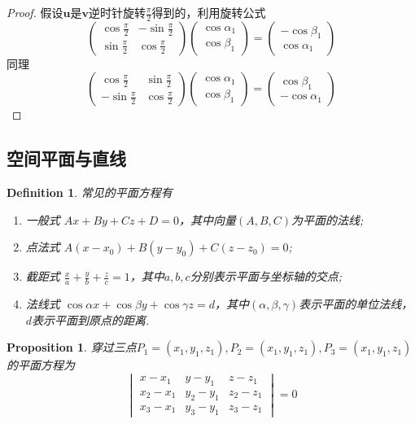 \documentclass{article}
\newcommand{\mbf}[1]{\bm{#1}}
\newtheorem{proposition}[theorem]{Proposition}
\newtheorem{definition}[theorem]{Definition}
\begin{document}
\begin{proof}
\rm 假设$\mbf{u}$是$\mbf{v}$逆时针旋转$\frac{\pi}{2}$得到的，利用旋转公式
$$
\begin{pmatrix}
\cos \frac{\pi}{2} & -\sin\frac{\pi}{2} \\
\sin \frac{\pi}{2} & \cos\frac{\pi}{2}
\end{pmatrix}\begin{pmatrix}
\cos \alpha_1 \\
\cos \beta_1
\end{pmatrix} = \begin{pmatrix}
-\cos\beta_1 \\
\cos \alpha_1
\end{pmatrix}
$$
同理
$$
\begin{pmatrix}
\cos \frac{\pi}{2} & \sin\frac{\pi}{2} \\
-\sin \frac{\pi}{2} & \cos\frac{\pi}{2}
\end{pmatrix}\begin{pmatrix}
\cos \alpha_1 \\
\cos \beta_1
\end{pmatrix} = \begin{pmatrix}
\cos\beta_1 \\
-\cos \alpha_1
\end{pmatrix}
$$
\end{proof}

\subsection{空间平面与直线}

\begin{definition}
\rm 常见的平面方程有
\begin{enumerate}
	\item 一般式 $Ax+By+Cz+D = 0$，其中向量$(A,B,C)$为平面的法线;
	\item 点法式 $A(x-x_0) + B(y-y_0) + C(z-z_0) = 0$;
	\item 截距式 $\frac{x}{a} + \frac{y}{b} + \frac{z}{c} = 1$，其中$a,b,c$分别表示平面与坐标轴的交点;
	\item 法线式 $\cos\alpha x + \cos\beta y + \cos\gamma z = d$，其中$(\alpha,\beta,\gamma)$表示平面的单位法线，$d$表示平面到原点的距离. 
\end{enumerate}
\end{definition}

\begin{proposition}
\rm 穿过三点$P_1 = (x_1,y_1,z_1),P_2 = (x_1,y_1,z_1),P_3 = (x_1,y_1,z_1)$的平面方程为
$$
{\begin{vmatrix}
x-x_{1} & y-y_{1} & z-z_{1}\\
x_{2}-x_{1} & y_{2}-y_{1} & z_{2}-z_{1}\\
x_{3}-x_{1} & y_{3}-y_{1} & z_{3}-z_{1}
\end{vmatrix}}=0
$$
\end{proposition}
\end{document}
